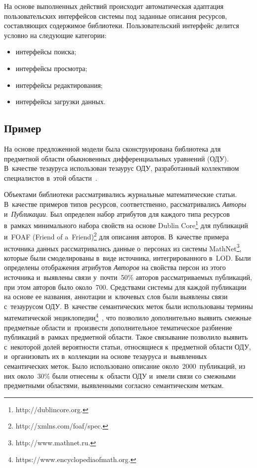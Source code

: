 \begin{multicols}{2}
     На основе выполненных действий происходит автоматическая 
адаптация пользовательских интер\-фей\-сов системы под заданные описания 
ресурсов, со\-став\-ля\-ющих содержимое биб\-лио\-те\-ки. Пользовательский 
интерфейс делится услов\-но на сле\-ду\-ющие категории:
     \begin{itemize}
\item интерфейсы поиска;\\[-13.5pt]
\item интерфейсы просмотра;\\[-13.5pt]
\item интерфейсы редактирования;\\[-13.5pt]
\item интерфейсы загрузки данных.
\end{itemize}

\vspace*{-8pt}

     \subsection*{Пример}
     
     \vspace*{-1pt}
     
     На основе предложенной модели была сконструирована 
библиотека для предметной об\-ласти обыкновенных дифференциальных 
урав\-нений (ОДУ). В~качестве тезауруса использован тезаурус ОДУ, 
разработанный коллективом специалистов в~этой области~\cite{7-ser}. 
     
     Объектами библиотеки рассматривались журнальные математические 
статьи. В~качестве примеров типов ресурсов, соответственно, 
рассматривались \textit{Авторы} и~\textit{Публикации}. Был определен набор 
атрибутов для каждого типа ресурсов в~рамках минимального набора свойств 
на основе Dublin Core\footnote{{\sf  http://dublincore.org.}} для публикаций 
и~FOAF (Friend of a~Friend)\footnote{{\sf http://xmlns.com/foaf/spec.}} для описания авторов. В~качестве 
примера источника данных рассматривались данные о~персонах из сис\-те\-мы 
MathNet\footnote{{\sf http://www.mathnet.ru}.}, которые были смоделированы в~виде 
источника, интегрированного в~LOD. Были определены отобра\-же\-ния 
атрибутов \textit{Авторов} на свойства персон из этого источника 
и~выявлены связи у~почти~50\% авторов рас\-смат\-ри\-ва\-емых пуб\-ли\-ка\-ций, при 
этом авторов было около~700.
     Средствами системы для каждой публикации на основе ее названия, 
аннотации и~ключевых слов были выявлены связи с~тезаурусом ОДУ. 
В~качестве семантических меток были использованы термины 
математической энциклопедии\footnote{{\sf 
https://www.encyclopediaofmath.org.}}~\cite{8-ser}, что позволило дополнительно 
выявить смежные предметные области и~произвести дополнительное 
тематическое разбиение пуб\-ли\-ка\-ций в~рамках предметной области. Такое 
связывание позволило выявить с~некоторой долей вероятности статьи, 
относящиеся к~предметной области ОДУ, и~организовать их в~коллекции на 
основе тезауруса и~выявленных семантических меток. Было использовано 
описание около~2000~пуб\-ли\-ка\-ций, из них около~30\% были отнесены 
к~об\-ласти ОДУ и~имели связи со смежными предметными областями, 
выявленными согласно семантическим меткам.


\end{multicols}
